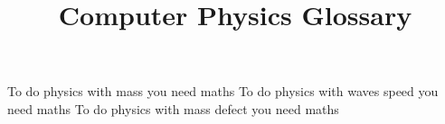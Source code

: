 \documentclass{article}
\title{Computer Physics Glossary}
\author{ }
\date{ }
\begin{document}
\maketitle
 
To do physics with \Gls{mass} you need \gls{maths}
To do physics with \Gls{waves speed} you need \gls{maths}
To do physics with \Gls{mass defect} you need \gls{maths}

 
\clearpage
 
\printglossaries
\end{document}
